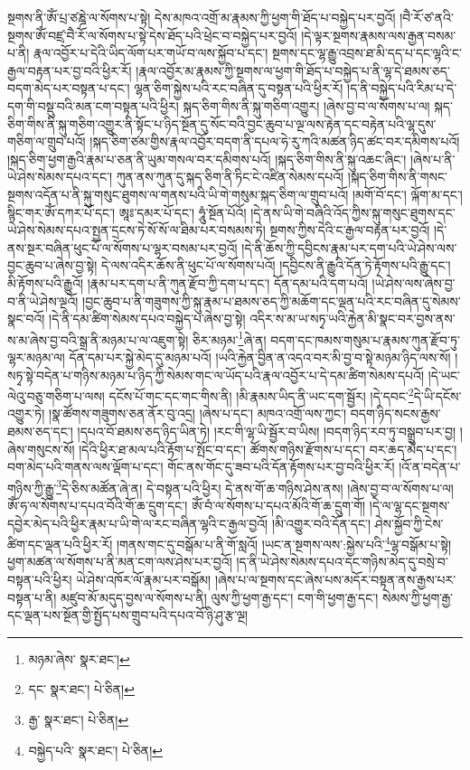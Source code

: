 སྔགས་ནི་ཨོཾ་པྲ་ཙཎྜེ་ལ་སོགས་པ་སྟེ། དེས་མཁའ་འགྲོ་མ་རྣམས་ཀྱི་ཕྱག་གི་ཐོད་པ་བསྐྱེད་པར་བྱའོ། །བཻ་རོ་ཙ་ནའི་སྔགས་ཨོཾ་བཛྲ་བཻ་རོ་ལ་སོགས་པ་སྟེ་དེས་ཐོད་པའི་ཕྲེང་བ་བསྐྱེད་པར་བྱའོ། །དེ་ལྟར་སྔགས་རྣམས་ལས་རྒྱན་བསམ་པ་ནི། རྣལ་འབྱོར་པ་དེའི་ཡིད་ལོག་པར་གཡོ་བ་ལས་སྐྱོབ་པ་དང་། སྔགས་དང་ལྷ་རྒྱུ་འབྲས་ཐ་མི་དད་པ་དང་ལྷའི་ང་རྒྱལ་བརྟན་པར་བྱ་བའི་ཕྱིར་རོ། །རྣལ་འབྱོར་མ་རྣམས་ཀྱི་སྔགས་ལ་ཕྱག་གི་ཐོད་པ་བསྐྱེད་པ་ནི་ལྷ་དེ་ཐམས་ཅད་བདག་མེད་པར་བསྟན་པ་དང་། ལྷན་ཅིག་སྐྱེས་པའི་རང་བཞིན་དུ་བསྟན་པའི་ཕྱིར་རོ། །ད་ནི་བསྐྱེད་པའི་རིམ་པ་དེ་དག་གི་བསྡུ་བའི་མན་ངག་བསྟན་པའི་ཕྱིར། སྐད་ཅིག་གིས་ནི་སྐུ་གཅིག་འགྱུར། །ཞེས་བྱ་བ་ལ་སོགས་པ་ལ། སྐད་ཅིག་གིས་ནི་སྐུ་གཅིག་འགྱུར་ནི་སྟོང་པ་ཉིད་སྔོན་དུ་སོང་བའི་བྱང་ཆུབ་པ་ལྔ་ལས་རྟེན་དང་བརྟེན་པའི་ལྷ་དུས་གཅིག་ལ་གྲུབ་པའོ། །སྐད་ཅིག་ཙམ་གྱིས་རྣལ་འབྱོར་བདག་ནི་དཔལ་ཧེ་རུ་ཀའི་མཚན་ཉིད་ཚང་བར་དམིགས་པའོ། །སྐད་ཅིག་ཕྱག་རྒྱའི་རྣམ་པ་ཅན་ནི་ཡུམ་གསལ་བར་དམིགས་པའོ། །སྐད་ཅིག་གིས་ནི་སྐུ་འཆང་ཞིང་། །ཞེས་པ་ནི་ཡེ་ཤེས་སེམས་དཔའ་དང་། ཀུན་ནས་ཀུན་དུ་སྐད་ཅིག་ནི་ཏིང་ངེ་འཛིན་སེམས་དཔའོ། །སྐད་ཅིག་གིས་ནི་གསང་སྔགས་འདོན་པ་ནི་སྐུ་གསུང་ཐུགས་ལ་གནས་པའི་ཡི་གེ་གསུམ་སྐད་ཅིག་ལ་གྲུབ་པའོ། །མགོ་བོ་དང་། ལྐོག་མ་དང་། སྙིང་གར་ཨོཾ་དཀར་པོ་དང་། ཨཱཿ་དམར་པོ་དང་། ཧཱུཾ་སྔོན་པོའོ། །དེ་ནས་ཡི་གེ་བཞིའི་འོད་ཀྱིས་སྐུ་གསུང་ཐུགས་དང་ཡེ་ཤེས་སེམས་དཔའ་སྤྱན་དྲངས་ཏེ་སོ་སོ་ལ་ཐིམ་པར་བསམས་ཏེ། སྔགས་ཀྱིས་དེའི་ང་རྒྱལ་བརྟན་པར་བྱའོ། །དེ་ནས་སྔར་བཞིན་ཕུང་པོ་ལ་སོགས་པ་ལྷར་བསམ་པར་བྱའོ། །དེ་ནི་ཆོས་ཀྱི་དབྱིངས་རྣམ་པར་དག་པའི་ཡེ་ཤེས་ལས་བྱང་ཆུབ་པ་ཞེས་བྱ་སྟེ། དེ་ལས་འདིར་ཆོས་ནི་ཕུང་པོ་ལ་སོགས་པའོ། །དབྱིངས་ནི་རྒྱུའི་དོན་ཏེ་རྟོགས་པའི་རྒྱུ་དང་། མི་རྟོགས་པའི་རྒྱུའོ། །རྣམ་པར་དག་པ་ནི་ཀུན་རྫོབ་ཀྱི་དག་པ་དང་། དོན་དམ་པའི་དག་པའོ། །ཡེ་ཤེས་ལས་ཞེས་བྱ་བ་ནི་ཡེ་ཤེས་ལྔའོ། །བྱང་ཆུབ་པ་ནི་གཟུགས་ཀྱི་སྐུ་རྣམ་པ་ཐམས་ཅད་ཀྱི་མཆོག་དང་ལྡན་པའི་རང་བཞིན་དུ་སེམས་སྣང་བའོ། །དེ་ནི་དམ་ཚིག་སེམས་དཔའ་བསྐྱེད་པ་ཞེས་བྱ་སྟེ། འདིར་ས་མ་ཡ་སཏྭ་ཡའི་རྐྱེན་མི་སྣང་བར་བྱས་ནས་ས་མ་ཞེས་བྱ་བའི་སྒྲ་ནི་མཉམ་པ་ལ་འཇུག་སྟེ། ཅིར་མཉམ་\footnote{མཉམ་ཞེས་  སྣར་ཐང་། }ཞེ་ན། བདག་དང་ཁམས་གསུམ་པ་རྣམས་ཀུན་རྫོབ་ཏུ་ལྷར་མཉམ་ལ། དོན་དམ་པར་སྐྱེ་མེད་དུ་མཉམ་པའོ། །ཡའི་རྐྱེན་བྱིན་ན་འདའ་བར་མི་བྱ་བ་སྟེ་མཉམ་ཉིད་ལས་སོ། །སཏྭ་སྟེ་བདེན་པ་གཉིས་མཉམ་པ་ཉིད་ཀྱི་སེམས་གང་ལ་ཡོད་པའི་རྣལ་འབྱོར་པ་དེ་དམ་ཚིག་སེམས་དཔའོ། །དེ་ཡང་ལེའུ་བཅུ་གཅིག་པ་ལས། དངོས་པོ་གང་དང་གང་གིས་ནི། །མི་རྣམས་ཡིད་ནི་ཡང་དག་སྦྱོར། །དེ་དབང་\footnote{དང་  སྣར་ཐང་།  པེ་ཅིན། }དེ་ཡི་དངོས་འགྱུར་ཏེ། །སྣ་ཚོགས་གཟུགས་ཅན་ནོར་བུ་འདྲ། །ཞེས་པ་དང་། མཁའ་འགྲོ་ལས་ཀྱང་། བདག་ཉིད་སངས་རྒྱས་ཐམས་ཅད་དང་། །དཔའ་བོ་ཐམས་ཅད་ཉིད་ཡིན་ཏེ། །རང་གི་ལྷ་ཡི་སྦྱོར་བ་ཡིས། །བདག་ཉིད་རབ་ཏུ་བསྒྲུབ་པར་བྱ། །ཞེས་གསུངས་སོ། །དེའི་ཕྱིར་ཐ་མལ་པའི་རྟོག་པ་སྤོང་བ་དང་། ཚོགས་གཉིས་རྫོགས་པ་དང་། བར་ཆད་མེད་པ་དང་། བག་མེད་པའི་གནས་ལས་ལྡོག་པ་དང་། གོང་ནས་གོང་དུ་ཟབ་པའི་དོན་རྟོགས་པར་བྱ་བའི་ཕྱིར་རོ། །འོ་ན་བདེན་པ་གཉིས་ཀྱི་རྒྱུ་\footnote{རྒྱ་  སྣར་ཐང་།  པེ་ཅིན། }དེ་ཅིས་མཚོན་ཞེ་ན། དེ་བསྟན་པའི་ཕྱིར། དེ་ནས་གོ་ཆ་གཉིས་ཤེས་ནས། །ཞེས་བྱ་བ་ལ་སོགས་པ་ལ། ཨོཾ་ཧ་ལ་སོགས་པ་དཔའ་བོའི་གོ་ཆ་དྲུག་དང་། ཨོཾ་བཾ་ལ་སོགས་པ་དཔའ་མོའི་གོ་ཆ་དྲུག་གོ། །དེ་ལ་ལྷ་དང་སྔགས་དབྱེར་མེད་པའི་ཕྱིར་རྣམ་པ་ཡི་གེ་ལ་རང་བཞིན་ལྷའི་ང་རྒྱལ་བྱའོ། །མི་འགྱུར་བའི་དོན་དང་། ཤེས་སྐྱོབ་ཀྱི་ངེས་ཚིག་དང་ལྡན་པའི་ཕྱིར་རོ། །གནས་གང་དུ་བསྒོམ་པ་ནི་གོ་སླའོ། །ཡང་ན་སྔགས་ལས་:སྐྱེས་པའི་\footnote{བསྐྱེད་པའི་  སྣར་ཐང་།  པེ་ཅིན། }ལྷ་བསྒོམ་པ་སྟེ། ཕྱག་མཚན་ལ་སོགས་པ་ནི་མན་ངག་ལས་ཤེས་པར་བྱའོ། །ད་ནི་ཡེ་ཤེས་སེམས་དཔའ་དང་གཉིས་མེད་དུ་བསྲེ་བ་བསྟན་པའི་ཕྱིར། ཡེ་ཤེས་འཁོར་ལོ་རྣམ་པར་བསྒོམ། །ཞེས་པ་ལ་སྔགས་དང་ཞེས་པས་མདོར་བསྟན་ནས་རྒྱས་པར་བསྟན་པ་ནི། མཛུབ་མོ་མདུད་བྱས་ལ་སོགས་པ་ནི། ལུས་ཀྱི་ཕྱག་རྒྱ་དང་། ངག་གི་ཕྱག་རྒྱ་དང་། སེམས་ཀྱི་ཕྱག་རྒྱ་དང་ལྡན་པས་སྔོན་གྱི་སྤྱོད་པས་གྲུབ་པའི་དཔའ་བོ་ཉི་ཤུ་རྩ་ལྔ། 
